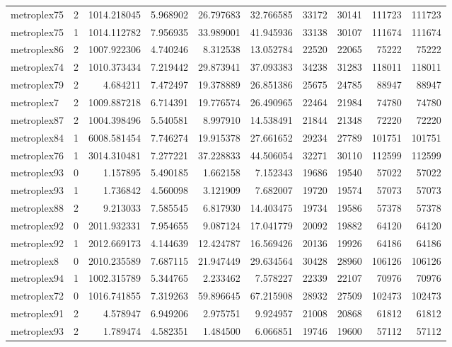 \begin{longtable}{|l|r|r|r|r|r|r|r|r|r|}
metroplex75 & 2 & 1014.218045 & 5.968902 & 26.797683 & 32.766585 & 33172 & 30141 & 111723 & 111723 \\
metroplex75 & 1 & 1014.112782 & 7.956935 & 33.989001 & 41.945936 & 33138 & 30107 & 111674 & 111674 \\
metroplex86 & 2 & 1007.922306 & 4.740246 & 8.312538 & 13.052784 & 22520 & 22065 & 75222 & 75222 \\
metroplex74 & 2 & 1010.373434 & 7.219442 & 29.873941 & 37.093383 & 34238 & 31283 & 118011 & 118011 \\
metroplex79 & 2 & 4.684211 & 7.472497 & 19.378889 & 26.851386 & 25675 & 24785 & 88947 & 88947 \\
metroplex7 & 2 & 1009.887218 & 6.714391 & 19.776574 & 26.490965 & 22464 & 21984 & 74780 & 74780 \\
metroplex87 & 2 & 1004.398496 & 5.540581 & 8.997910 & 14.538491 & 21844 & 21348 & 72220 & 72220 \\
metroplex84 & 1 & 6008.581454 & 7.746274 & 19.915378 & 27.661652 & 29234 & 27789 & 101751 & 101751 \\
metroplex76 & 1 & 3014.310481 & 7.277221 & 37.228833 & 44.506054 & 32271 & 30110 & 112599 & 112599 \\
metroplex93 & 0 & 1.157895 & 5.490185 & 1.662158 & 7.152343 & 19686 & 19540 & 57022 & 57022 \\
metroplex93 & 1 & 1.736842 & 4.560098 & 3.121909 & 7.682007 & 19720 & 19574 & 57073 & 57073 \\
metroplex88 & 2 & 9.213033 & 7.585545 & 6.817930 & 14.403475 & 19734 & 19586 & 57378 & 57378 \\
metroplex92 & 0 & 2011.932331 & 7.954655 & 9.087124 & 17.041779 & 20092 & 19882 & 64120 & 64120 \\
metroplex92 & 1 & 2012.669173 & 4.144639 & 12.424787 & 16.569426 & 20136 & 19926 & 64186 & 64186 \\
metroplex8 & 0 & 2010.235589 & 7.687115 & 21.947449 & 29.634564 & 30428 & 28960 & 106126 & 106126 \\
metroplex94 & 1 & 1002.315789 & 5.344765 & 2.233462 & 7.578227 & 22339 & 22107 & 70976 & 70976 \\
metroplex72 & 0 & 1016.741855 & 7.319263 & 59.896645 & 67.215908 & 28932 & 27509 & 102473 & 102473 \\
metroplex91 & 2 & 4.578947 & 6.949206 & 2.975751 & 9.924957 & 21008 & 20868 & 61812 & 61812 \\
metroplex93 & 2 & 1.789474 & 4.582351 & 1.484500 & 6.066851 & 19746 & 19600 & 57112 & 57112 \\

\end{longtable}
